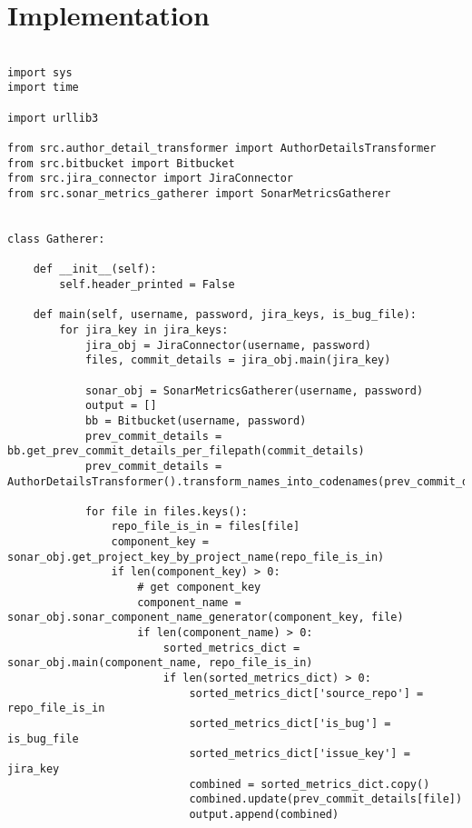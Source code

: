 \section{Implementation}\label{sec:implementation}
\begin{landscape}

\begin{code}

\label{code:c-code}
\begin{verbatim}

import sys
import time

import urllib3

from src.author_detail_transformer import AuthorDetailsTransformer
from src.bitbucket import Bitbucket
from src.jira_connector import JiraConnector
from src.sonar_metrics_gatherer import SonarMetricsGatherer


class Gatherer:

    def __init__(self):
        self.header_printed = False

    def main(self, username, password, jira_keys, is_bug_file):
        for jira_key in jira_keys:
            jira_obj = JiraConnector(username, password)
            files, commit_details = jira_obj.main(jira_key)

            sonar_obj = SonarMetricsGatherer(username, password)
            output = []
            bb = Bitbucket(username, password)
            prev_commit_details = bb.get_prev_commit_details_per_filepath(commit_details)
            prev_commit_details = AuthorDetailsTransformer().transform_names_into_codenames(prev_commit_details)

            for file in files.keys():
                repo_file_is_in = files[file]
                component_key = sonar_obj.get_project_key_by_project_name(repo_file_is_in)
                if len(component_key) > 0:
                    # get component_key
                    component_name = sonar_obj.sonar_component_name_generator(component_key, file)
                    if len(component_name) > 0:
                        sorted_metrics_dict = sonar_obj.main(component_name, repo_file_is_in)
                        if len(sorted_metrics_dict) > 0:
                            sorted_metrics_dict['source_repo'] = repo_file_is_in
                            sorted_metrics_dict['is_bug'] = is_bug_file
                            sorted_metrics_dict['issue_key'] = jira_key
                            combined = sorted_metrics_dict.copy()
                            combined.update(prev_commit_details[file])
                            output.append(combined)


\end{verbatim}
\end{code}
\end{landscape}

